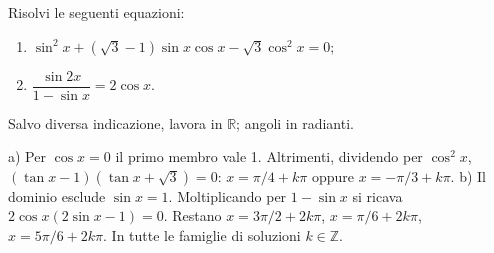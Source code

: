 
\begin{esercizio}
Risolvi le seguenti equazioni: 

\begin{enumerate}
\item $\displaystyle
\sin^2x+(\sqrt{3}-1)\sin x\cos x-\sqrt{3}\cos^2x=0;$

\item $\displaystyle
\dfrac{\sin 2x}{1-\sin x}=2\cos x.$
\end{enumerate}
Salvo diversa indicazione, lavora in $\mathbb R$; angoli in radianti.
\end{esercizio}

\begin{soluzione}
a) Per $\cos x=0$ il primo membro vale 1. Altrimenti, dividendo per $\cos^2x$,
$(\tan x-1)(\tan x+\sqrt3)=0$: $x=\pi/4+k\pi$ oppure $x=-\pi/3+k\pi$.
b) Il dominio esclude $\sin x=1$. Moltiplicando per $1-\sin x$ si ricava
$2\cos x(2\sin x-1)=0$. Restano $x=3\pi/2+2k\pi$, $x=\pi/6+2k\pi$, $x=5\pi/6+2k\pi$. In tutte le famiglie di soluzioni $k\in\mathbb{Z}$.
\end{soluzione}
